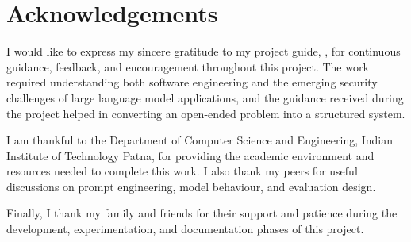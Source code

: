 \chapter*{\centering Acknowledgements}
\quad I would like to express my sincere gratitude to my project guide, \the\guide, for continuous guidance, feedback, and encouragement throughout this project. The work required understanding both software engineering and the emerging security challenges of large language model applications, and the guidance received during the project helped in converting an open-ended problem into a structured system.

I am thankful to the Department of Computer Science and Engineering, Indian Institute of Technology Patna, for providing the academic environment and resources needed to complete this work. I also thank my peers for useful discussions on prompt engineering, model behaviour, and evaluation design.

Finally, I thank my family and friends for their support and patience during the development, experimentation, and documentation phases of this project.

